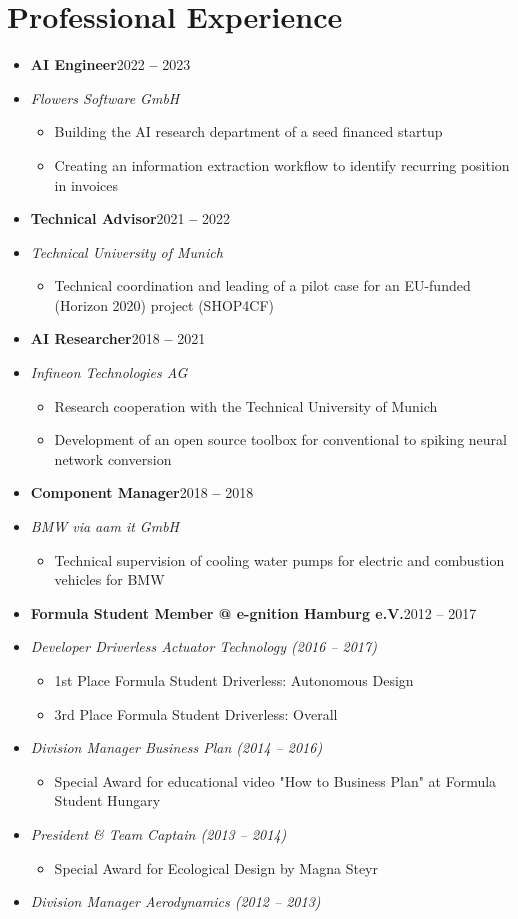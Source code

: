 \documentclass[a4paper,11pt]{article}
\newcommand{\entryBf}[2]{\item \textbf{#1}\hfill #2\vspace{-9pt}}
\newcommand{\entryIt}[1]{\item \textit{\small #1}\vspace{-7pt}}
\newcommand{\cvItemizeBegin}{\begin{itemize}[rightmargin=75pt]}
\newcommand{\cvItemizeEnd}{\end{itemize} \vspace{-7pt}}
\newcommand{\cvItem}[1]{\item[--] \small #1\vspace{-2pt}}
\begin{document}
\section{Professional Experience}
\begin{itemize}
    
    \entryBf{AI Engineer}{2022 \textbf{--} 2023}
    \entryIt{Flowers Software GmbH}
    \cvItemizeBegin
        \cvItem{Building the AI research department of a seed financed startup}
        \cvItem{Creating an information extraction workflow to identify recurring position in invoices}
    \cvItemizeEnd

    \entryBf{Technical Advisor}{2021 \textbf{--} 2022}
    \entryIt{Technical University of Munich}
    \cvItemizeBegin
        \cvItem{Technical coordination and leading of a pilot case for an EU-funded (Horizon 2020) project (SHOP4CF)}
    \cvItemizeEnd

    \entryBf{AI Researcher}{2018 \textbf{--} 2021}
    \entryIt{Infineon Technologies AG}
    \cvItemizeBegin
        \cvItem{Research cooperation with the Technical University of Munich}
        \cvItem{Development of an open source toolbox for conventional to spiking neural network conversion}
    \cvItemizeEnd
    
    \entryBf{Component Manager}{2018 \textbf{--} 2018}
    \entryIt{BMW via aam it GmbH}
    \cvItemizeBegin
        \cvItem{Technical supervision of cooling water pumps for electric and combustion vehicles for BMW}
    \cvItemizeEnd
    
    \entryBf{Formula Student Member @ e-gnition Hamburg e.V.}{2012 {--} 2017}
    \entryIt{Developer Driverless Actuator Technology (2016 -- 2017)}
    \cvItemizeBegin
        \cvItem{1st Place Formula Student Driverless: Autonomous Design}
        \cvItem{3rd Place Formula Student Driverless: Overall}
    \cvItemizeEnd
    \vspace{-4pt}
    \entryIt{Division Manager Business Plan (2014 -- 2016)}
    \cvItemizeBegin
        \cvItem{Special Award for educational video "How to Business Plan" at Formula Student Hungary}
    \cvItemizeEnd
    \vspace{-4pt}
    \entryIt{President \& Team Captain (2013 -- 2014)}
    \cvItemizeBegin
        \cvItem{Special Award for Ecological Design by Magna Steyr}
    \cvItemizeEnd
    \vspace{-4pt}
    \entryIt{Division Manager Aerodynamics (2012 -- 2013)}
    \vspace{2pt}
    

\end{itemize}
\end{document}
